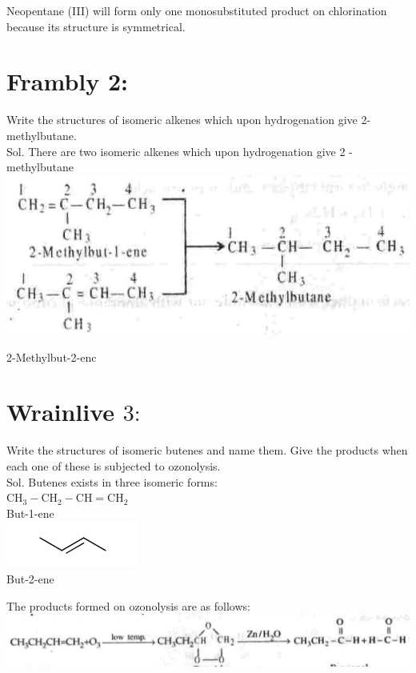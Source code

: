 \documentclass[10pt]{article}
\begin{document}
Neopentane (III) will form only one monosubstituted product on chlorination because its structure is symmetrical.

\section*{Frambly 2:}
Write the structures of isomeric alkenes which upon hydrogenation give 2-methylbutane.\\
Sol. There are two isomeric alkenes which upon hydrogenation give 2 -methylbutane\\
\includegraphics[max width=\textwidth, center]{2025_01_28_8470952b98110cec3aabg-197(5)}

2-Methylbut-2-enc

\section*{Wrainlive $3:$}
Write the structures of isomeric butenes and name them. Give the products when each one of these is subjected to ozonolysis.\\
Sol. Butenes exists in three isomeric forms:\\
$\mathrm{CH}_{3}-\mathrm{CH}_{2}-\mathrm{CH}=\mathrm{CH}_{2}$\\
But-1-ene\\
\includegraphics{smile-506bf0dbf803e3ad506b483383c267dae0859fa6}\\
But-2-ene

The products formed on ozonolysis are as follows:\\
\includegraphics[max width=\textwidth, center]{2025_01_28_8470952b98110cec3aabg-197(2)}
\end{document}
